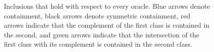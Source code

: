 \begin{figure}[htb]
  \caption{\label{fig:mini-zoo-inclusion} Inclusions that hold with respect to 
  every oracle. Blue arrows denote containment, black arrows denote symmetric 
  containment, red arrows indicate that the complement of the first class is contained 
  in the second, and green arrows indicate that the intersection of the first class with
  its complement is contained in the second class.}
\end{figure}

